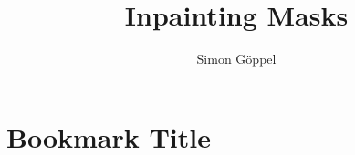 \documentclass[8pt,t,usepdftitle=false,aspectratio=169]{beamer}
\title[]{Inpainting Masks}
\subtitle{}
\author[Simon G\"oppel]{Simon G\"oppel}
\date{}
\begin{document}




\section{Bookmark Title}


\end{document}
